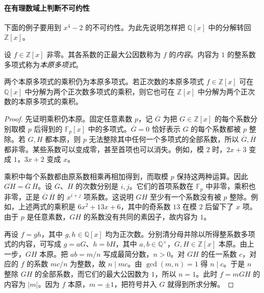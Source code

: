 \documentclass[lang=cn,a4paper,fontset=none,zihao=false,10pt,openany,twoside]{beautybook}
\numberwithin{algorithm}{chapter}
\begin{document}
\paragraph{在有理数域上判断不可约性}
下面的例子要用到 $x^4-2$ 的不可约性。为此先说明怎样把 $\mathbb Q[x]$ 中的分解转回 $\mathbb Z[x]$。

\begin{definition}[本原多项式]\label{def:primitive-integer-polynomial}
设 $f\in\mathbb Z[x]$ 非零。其各系数的正最大公因数称为 $f$ 的\emph{内容}。内容为 $1$ 的整系数多项式称为\emph{本原多项式}。
\end{definition}

\begin{lemma}[Gauss 引理]\label{lem:gauss-primitive-polynomials}
两个本原多项式的乘积仍为本原多项式。若正次数的本原多项式 $f\in\mathbb Z[x]$ 可在 $\mathbb Q[x]$ 中分解为两个正次数多项式的乘积，则它也可在 $\mathbb Z[x]$ 中分解为两个正次数的本原多项式的乘积。
\end{lemma}
\begin{proof}
先证明乘积仍本原。固定任意素数 $p$，记 $\overline G$ 为把 $G\in\mathbb Z[x]$ 的每个系数分别取模 $p$ 后得到的 $\mathbb F_p[x]$ 中的多项式。$\overline G=0$ 恰好表示 $G$ 的每个系数都被 $p$ 整除。若 $G,H$ 都本原，则 $p$ 无法整除其中任何一个多项式的全部系数，所以 $\overline G,\overline H$ 都非零。某些系数可以变成零，甚至首项也可以消失。例如，模 $2$ 时，$2x+3$ 变成 $1$，$3x+2$ 变成 $x$。

乘积中每个系数都由原系数相乘再相加得到，而取模 $p$ 保持这两种运算。因此 $\overline{GH}=\overline G\,\overline H$。设 $\overline G$、$\overline H$ 的次数分别是 $i,j$。它们的首项系数在 $\mathbb F_p$ 中非零，乘积也非零，正是 $\overline G\,\overline H$ 的 $x^{i+j}$ 项系数。这说明 $GH$ 至少有一个系数没有被 $p$ 整除。例如，上述两式的乘积是 $6x^2+13x+6$，其中的奇系数 $13$ 在模 $2$ 后留下了 $x$ 项。由于 $p$ 是任意素数，$GH$ 的系数没有共同的素因子，故内容为 $1$。

再设 $f=gh$，其中 $g,h\in\mathbb Q[x]$ 均为正次数。分别清分母并除以所得整系数多项式的内容，可写成 $g=aG$、$h=bH$，其中 $a,b\in\mathbb Q^\times$，$G,H\in\mathbb Z[x]$ 本原。由上一步，$GH$ 本原。把 $ab=m/n$ 写成最简分数，$n>0$。对 $GH$ 的任一系数 $c$，对应的 $f$ 的系数 $mc/n$ 为整数，故 $n\mid mc$。由 $\gcd(m,n)=1$ 得 $n\mid c$。于是 $n$ 整除 $GH$ 的全部系数，而它们的最大公因数为 $1$，所以 $n=1$。此时 $f=mGH$ 的内容为 $|m|$。因为 $f$ 本原，$m=\pm1$，把符号并入 $G$ 就得到所求分解。
\end{proof}
\end{document}
